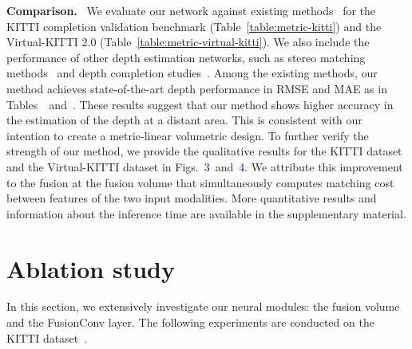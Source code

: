 \documentclass[letterpaper, 10 pt, conference]{ieeeconf}
\newcommand{\Tref}[1]{Table~\textcolor{blue}{\ref{#1}}}
\newcommand{\RNum}[1]{\uppercase\expandafter{\romannumeral #1\relax}}
\begin{document}
\noindent \textbf{Comparison.} \
We evaluate our network against existing methods~\cite{stereolidar_01,stereolidar_00,stereolidar_norm_costV_ccvn} for the KITTI completion validation benchmark (\Tref{table:metric-kitti}) and the Virtual-KITTI 2.0 (\Tref{table:metric-virtual-kitti}). We also include the performance of other depth estimation networks, such as stereo matching methods~\cite{psmnet,gcnet} and depth completion studies~\cite{sparse-to-dense,guidenet,jinsunpark,cspn++}. Among the existing methods, our method achieves state-of-the-art depth performance in RMSE and MAE as in Tables~\textcolor{blue}{\RNum{1}}~and~\textcolor{blue}{\RNum{2}}. These results suggest that our method shows higher accuracy in the estimation of the depth at a distant area. This is consistent with our intention to create a metric-linear volumetric design. To further verify the strength of our method, we provide the qualitative results for the KITTI dataset and the Virtual-KITTI dataset in Figs.~\textcolor{blue}{3}~and~\textcolor{blue}{4}. We attribute this improvement to the fusion at the fusion volume that simultaneously computes matching cost between features of the two input modalities. More quantitative results and information about the inference time are available in the supplementary material.


\vspace{-1mm}
\section{Ablation study}
\label{sec:Ablation study}
In this section, we extensively investigate our neural modules: the fusion volume and the FusionConv layer. 
The following experiments are conducted on the KITTI dataset~\cite{kitti-completion}.
\end{document}
